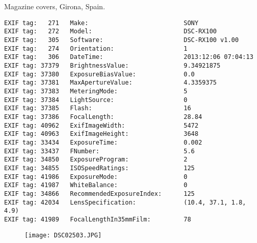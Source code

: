 \section{\protect{}}
\noindent Magazine covers, Girona, Spain.
\noindent
\begin{lstlisting}
EXIF tag:   271   Make:                          SONY
EXIF tag:   272   Model:                         DSC-RX100
EXIF tag:   305   Software:                      DSC-RX100 v1.00
EXIF tag:   274   Orientation:                   1
EXIF tag:   306   DateTime:                      2013:12:06 07:04:13
EXIF tag: 37379   BrightnessValue:               9.34921875
EXIF tag: 37380   ExposureBiasValue:             0.0
EXIF tag: 37381   MaxApertureValue:              4.3359375
EXIF tag: 37383   MeteringMode:                  5
EXIF tag: 37384   LightSource:                   0
EXIF tag: 37385   Flash:                         16
EXIF tag: 37386   FocalLength:                   28.84
EXIF tag: 40962   ExifImageWidth:                5472
EXIF tag: 40963   ExifImageHeight:               3648
EXIF tag: 33434   ExposureTime:                  0.002
EXIF tag: 33437   FNumber:                       5.6
EXIF tag: 34850   ExposureProgram:               2
EXIF tag: 34855   ISOSpeedRatings:               125
EXIF tag: 41986   ExposureMode:                  0
EXIF tag: 41987   WhiteBalance:                  0
EXIF tag: 34866   RecommendedExposureIndex:      125
EXIF tag: 42034   LensSpecification:             (10.4, 37.1, 1.8, 4.9)
EXIF tag: 41989   FocalLengthIn35mmFilm:         78

\end{lstlisting}
\clearpage
\begin{figure}
\raggedleft
\texttt{[image: DSC02503.JPG]}
\end{figure}


\clearpage
